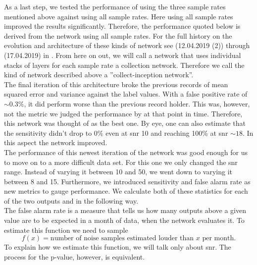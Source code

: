 As a last step, we tested the performance of using the three sample rates mentioned above against using all sample rates. Here using all sample rates improved the results significantly. Therefore, the performance quoted below is derived from the network using all sample rates. For the full history on the evolution and architecture of these kinds of network see (12.04.2019 (2)) through (17.04.2019) in \cite{network_wiki}. From here on out, we will call a network that uses individual stacks of layers for each sample rate a collection network. Therefore we call the kind of network described above a ''collect-inception network''.\\
The final iteration of this architecture broke the previous records of mean squared error and variance against the label values. With a false positive rate of $\sim 0.3\%$, it did perform worse than the previous record holder. This was, however, not the metric we judged the performance by at that point in time. Therefore, this network was thought of as the best one. By eye, one can also estimate that the sensitivity didn't drop to 0\% even at \gls{snr} 10 and reaching 100\% at \gls{snr} $\sim 18$. In this aspect the network improved.\medskip\\
The performance of this newest iteration of the network was good enough for us to move on to a more difficult data set. For this one we only changed the \gls{snr} range. Instead of varying it between 10 and 50, we went down to varying it between 8 and 15. Furthermore, we introduced sensitivity and false alarm rate as new metrics to gauge performance. We calculate both of these statistics for each of the two outputs and in the following way.\\
The false alarm rate is a measure that tells us how many outputs above a given value are to be expected in a month of data, when the network evaluates it. To estimate this function we need to sample
\begin{equation}\label{def:false_alarm_rate}
f(x)=\text{number of noise samples estimated louder than }x\text{ per month}.
\end{equation}
To explain how we estimate this function, we will talk only about \gls{snr}. The process for the p-value, however, is equivalent.\\
